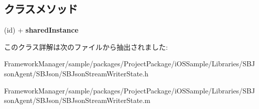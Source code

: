 \subsection*{クラスメソッド}
\begin{DoxyCompactItemize}
\item 
\hypertarget{interface_s_b_json_stream_writer_state_ab01e9e997789a8f04bc4730801aab8ca}{}(id) + {\bfseries shared\+Instance}\label{interface_s_b_json_stream_writer_state_ab01e9e997789a8f04bc4730801aab8ca}

\end{DoxyCompactItemize}


このクラス詳解は次のファイルから抽出されました\+:\begin{DoxyCompactItemize}
\item 
Framework\+Manager/sample/packages/\+Project\+Package/i\+O\+S\+Sample/\+Libraries/\+S\+B\+Json\+Agent/\+S\+B\+Json/S\+B\+Json\+Stream\+Writer\+State.\+h\item 
Framework\+Manager/sample/packages/\+Project\+Package/i\+O\+S\+Sample/\+Libraries/\+S\+B\+Json\+Agent/\+S\+B\+Json/S\+B\+Json\+Stream\+Writer\+State.\+m\end{DoxyCompactItemize}

